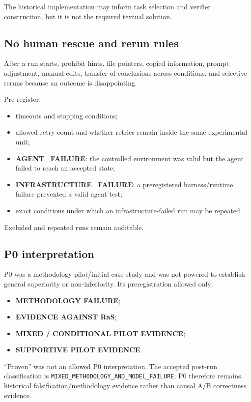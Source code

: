 The historical implementation may inform task selection and verifier construction, but it is not the required textual solution.

\subsection{No human rescue and rerun rules}

After a run starts, prohibit hints, file pointers, copied information, prompt adjustment, manual edits, transfer of conclusions across conditions, and selective reruns because an outcome is disappointing.

Pre-register:
\begin{itemize}
    \item timeouts and stopping conditions;
    \item allowed retry count and whether retries remain inside the same experimental unit;
    \item \textbf{AGENT_FAILURE}: the controlled environment was valid but the agent failed to reach an accepted state;
    \item \textbf{INFRASTRUCTURE_FAILURE}: a preregistered harness/runtime failure prevented a valid agent test;
    \item exact conditions under which an infrastructure-failed run may be repeated.
\end{itemize}

Excluded and repeated runs remain auditable.

\subsection{P0 interpretation}

P0 was a methodology pilot/initial case study and was not powered to establish general superiority or non-inferiority. Its preregistration allowed only:
\begin{itemize}
    \item \textbf{METHODOLOGY FAILURE};
    \item \textbf{EVIDENCE AGAINST RaS};
    \item \textbf{MIXED / CONDITIONAL PILOT EVIDENCE};
    \item \textbf{SUPPORTIVE PILOT EVIDENCE}.
\end{itemize}
“Proven” was not an allowed P0 interpretation. The accepted post-run classification is \texttt{MIXED\_METHODOLOGY\_AND\_MODEL\_FAILURE}; P0 therefore remains historical falsification/methodology evidence rather than causal A/B correctness evidence.

